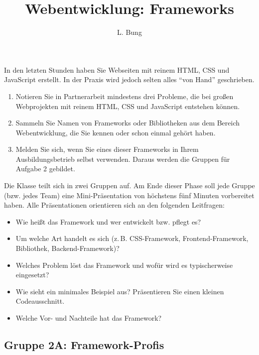\documentclass[11pt, a4paper, oneside]{article}
\begin{document}
	\author{L. Bung}
	\title{Webentwicklung: Frameworks}
	\subject{SAE}
	\maketitle



	In den letzten Stunden haben Sie Webseiten mit reinem HTML, CSS und JavaScript erstellt.
	In der Praxis wird jedoch selten alles ``von Hand'' geschrieben.

	\begin{enumerate}[label=\alph*)]
		\item Notieren Sie in Partnerarbeit mindestens drei Probleme, die bei großen Webprojekten mit reinem HTML, CSS und JavaScript entstehen können.
		\item Sammeln Sie Namen von Frameworks oder Bibliotheken aus dem Bereich Webentwicklung, die Sie kennen oder schon einmal gehört haben.
		\item Melden Sie sich, wenn Sie eines dieser Frameworks in Ihrem Ausbildungsbetrieb selbst verwenden.
		Daraus werden die Gruppen für Aufgabe 2 gebildet.
	\end{enumerate}

    \lines[6cm]



	Die Klasse teilt sich in zwei Gruppen auf.
	Am Ende dieser Phase soll jede Gruppe (bzw. jedes Team) eine Mini-Präsentation von höchstens fünf Minuten vorbereitet haben.
	Alle Präsentationen orientieren sich an den folgenden Leitfragen:

	\begin{itemize}
		\item Wie heißt das Framework und wer entwickelt bzw. pflegt es?
		\item Um welche Art handelt es sich (z.\,B. CSS-Framework, Frontend-Framework, Bibliothek, Backend-Framework)?
		\item Welches Problem löst das Framework und wofür wird es typischerweise eingesetzt?
		\item Wie sieht ein minimales Beispiel aus?
        Präsentieren Sie einen kleinen Codeausschnitt.
		\item Welche Vor- und Nachteile hat das Framework?
	\end{itemize}

	\subsection*{Gruppe 2A: Framework-Profis}
\end{document}
